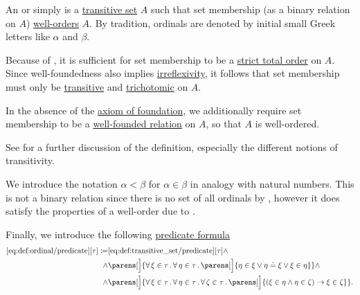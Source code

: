 \begin{definition}\label{def:ordinal}
  An  or simply  is a \hyperref[def:transitive_set]{transitive set} \( A \) such that set membership (as a binary relation on \( A \)) \hyperref[def:well_ordered_set]{well-orders} \( A \). By tradition, ordinals are denoted by initial small Greek letters like \( \alpha \) and \( \beta \).

  Because of , it is sufficient for set membership to be a \hyperref[def:totally_ordered_set]{strict total order} on \( A \). Since well-foundedness also implies \hyperref[def:binary_relation/irreflexive]{irreflexivity}, it follows that set membership must only be \hyperref[def:binary_relation/transitive]{transitive} and \hyperref[def:binary_relation/trichotomic]{trichotomic} on \( A \).

  In the absence of the \hyperref[def:zfc/foundation]{axiom of foundation}, we additionally require set membership to be a \hyperref[rem:well_founded_relation]{well-founded relation} on \( A \), so that \( A \) is well-ordered.

  See  for a further discussion of the definition, especially the different notions of transitivity.

  We introduce the notation \( \alpha < \beta \) for \( \alpha \in \beta \) in analogy with natural numbers. This is not a binary relation since there is no set of all ordinals by , however it does satisfy the properties of a well-order due to .

  Finally, we introduce the following \hyperref[rem:predicate_formula]{predicate formula}
  \begin{equation*}\taglabel[\op{IsOrdinal}]{eq:def:ordinal/predicate}
    \begin{aligned}
      \ref{eq:def:ordinal/predicate}[\tau] \coloneqq
        &\ref{eq:def:transitive_set/predicate}[\tau]
        \wedge \\ \wedge&
        \parens[\Big]
        {
          \qforall {\xi \in \tau}
          \qforall {\eta \in \tau}
          \parens[\Big]
            {
              \eta \in \xi \vee \eta \doteq \xi \vee \xi \in \eta
            }
        }
        \wedge \\ \wedge&
        \parens[\Big]
        {
          \qforall {\xi \in \tau}
          \qforall {\eta \in \tau}
          \qforall {\zeta \in \tau}
          \parens[\Big]
          {
            (\xi \in \eta \wedge \eta \in \zeta) \rightarrow \xi \in \zeta
          }
        }.
    \end{aligned}
  \end{equation*}
\end{definition}

